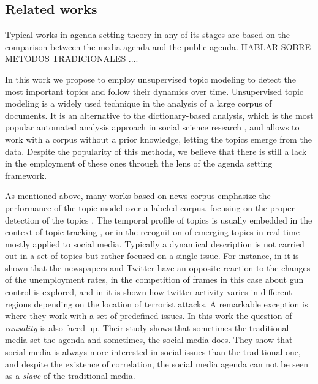 



\subsection{Related works}

\par Typical works in agenda-setting theory in any of its stages are based on the comparison between the media agenda and the public agenda. 
HABLAR SOBRE METODOS TRADICIONALES ....



\par In this work we propose to employ unsupervised topic modeling to detect the most important topics and follow their dynamics over time.
Unsupervised topic modeling is a widely used technique in the analysis of a large corpus of documents.
It is an alternative to the dictionary-based analysis, which is the most popular automated analysis approach in social science research \cite{guo2016big}, and allows to work with a corpus without a prior knowledge, letting the topics emerge from the data. Despite the popularity of this methods, we believe that there is still a lack in the employment of these ones through the lens of the agenda setting framework.
\par As mentioned above, many works based on news corpus emphasize the performance of the topic model over a labeled corpus, focusing on the proper detection of the topics \cite{dai2010online}\cite{po2016topic}\cite{brun2000experiment}.
The temporal profile of topics is usually embedded in the context of topic tracking \cite{hu2016news}\cite{li2017joint}, or in the recognition of emerging topics in real-time \cite{cataldi2010emerging} mostly applied to social media.
Typically a dynamical description is not carried out in a set of topics but rather focused on a single issue.
For instance, in \cite{soroka2017negativity} it is shown that the newspapers and Twitter have an opposite reaction to the changes of the unemployment rates, in \cite{guggenheim2015dynamics} the competition of frames in this case about gun control is explored,
and in \cite{ali2018measuring} it is shown how twitter activity varies in different regions depending on the location of terrorist attacks.
A remarkable exception is \cite{russell2014dynamics} where they work with a set of predefined issues. In this work the question of \emph{causality} is also faced up. Their study shows that sometimes the traditional media set the agenda and sometimes, the social media does. They show that social media is always more interested in social issues than the traditional one, and despite the existence of correlation, the social media agenda can not be seen as a \emph{slave} of the traditional media.

